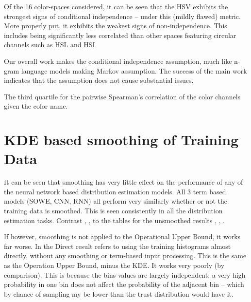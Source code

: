 \documentclass[11pt,a4paper]{article}
\begin{document}
Of the 16 color-spaces considered, it can be seen that the HSV exhibits the strongest signs of conditional independence -- under this (mildly flawed) metric.
More properly put, it exhibits the weakest signs of non-independence.
This includes being significantly less correlated than other spaces featuring circular channels such as HSL and HSI.

Our overall work makes the conditional independence assumption, much like n-gram language models making Markov assumption.
The success of the main work indicates that the assumption does not cause substantial issues.



\begin{table}
	\centering
	\caption{\label{tbl:colorcor} The third quartile for the pairwise Spearman's correlation of the color channels given the color name.}
	
\end{table}

\section{KDE based smoothing of Training Data}\label{sec:smoothed-results}

It can be seen that smoothing has very little effect on the performance of any of the neural network based distribution estimation models.
All 3 term based models (SOWE, CNN, RNN) all perform very similarly whether or not the training data is smoothed.
This is seen consistently in all the distribution estimation tasks.
Contrast , , 
to the tables for the unsmoothed results
, , .

If however, smoothing is not applied to the Operational Upper Bound, it works far worse.
In   the Direct result refers to using the training histograms almost directly, without any smoothing or term-based input processing.
This is the same as the Operation Upper Bound, minus the KDE.
It works very poorly (by comparison).
This is because the bins values are largely independent: a very high probability in one bin does not affect the probability of the adjacent bin -- which by chance of sampling my be lower than the trust distribution would have it.
\end{document}
